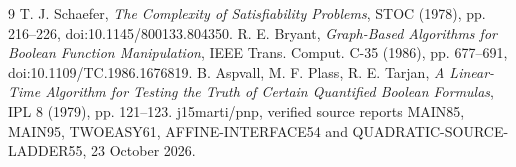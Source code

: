 \documentclass[11pt]{article}
\begin{document}
\begin{thebibliography}{9}
 T. J. Schaefer, \emph{The Complexity of Satisfiability Problems}, STOC (1978), pp. 216--226, doi:10.1145/800133.804350.
 R. E. Bryant, \emph{Graph-Based Algorithms for Boolean Function Manipulation}, IEEE Trans. Comput. C-35 (1986), pp. 677--691, doi:10.1109/TC.1986.1676819.
 B. Aspvall, M. F. Plass, R. E. Tarjan, \emph{A Linear-Time Algorithm for Testing the Truth of Certain Quantified Boolean Formulas}, IPL 8 (1979), pp. 121--123.
 j15marti/pnp, verified source reports MAIN85, MAIN95, TWOEASY61, AFFINE-INTERFACE54 and QUADRATIC-SOURCE-LADDER55, 23 October 2026.
\end{thebibliography}
\end{document}
